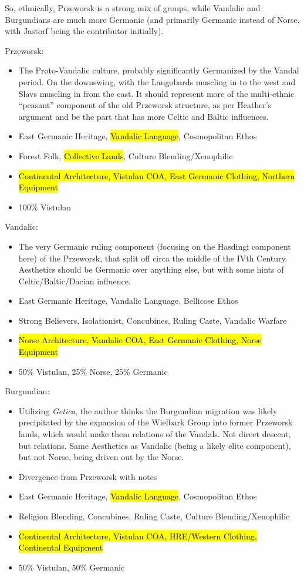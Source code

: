 \documentclass{article}
\begin{document}
	So, ethnically, Przeworsk is a strong mix of groups, while Vandalic and Burgundians are much more Germanic (and primarily Germanic instead of Norse, with Jastorf being the contributor initially).
	
	Przeworsk:
	\begin{itemize}
		\item The Proto-Vandalic culture, probably significantly Germanized by the Vandal period. On the downswing, with the Langobards muscling in to the west and Slavs muscling in from the east.
		It should represent more of the multi-ethnic “peasant” component of the old Przeworsk structure, as per Heather’s argument and be the part that has more Celtic and Baltic influences.
		\item East Germanic Heritage, \hl{Vandalic Language}, Cosmopolitan Ethos
		\item Forest Folk, \hl{Collective Lands}, Culture Blending/Xenophilic
		\item \hl{Continental Architecture, Vistulan COA, East Germanic Clothing, Northern Equipment}
		\item 100\% Vistulan
	\end{itemize}
	
	Vandalic:
	\begin{itemize}
		\item The very Germanic ruling component (focusing on the Hasdingi component here) of the Przeworsk, that split off circa the middle of the IVth Century.
		Aesthetics should be Germanic over anything else, but with some hints of Celtic/Baltic/Dacian influence.
		\item East Germanic Heritage, Vandalic Language, Bellicose Ethos
		\item Strong Believers, Isolationist, Concubines, Ruling Caste, Vandalic Warfare
		\item \hl{Norse Architecture, Vandalic COA, East Germanic Clothing, Norse Equipment}
		\item 50\% Vistulan, 25\% Norse, 25\% Germanic
	\end{itemize}
	
	Burgundian:
	\begin{itemize}
		\item Utilizing \textit{Getica}, the author thinks the Burgundian migration was likely precipitated by the expansion of the Wielbark Group into former Przeworsk lands, which would make them relations of the Vandals.
		Not direct descent, but relations.
		Same Aesthetics as Vandalic (being a likely elite component), but not Norse, being driven out by the Norse.
		\item Divergence from Przeworsk with notes
		\item East Germanic Heritage, \hl{Vandalic Language}, Cosmopolitan Ethos
		\item Religion Blending, Concubines, Ruling Caste, Culture Blending/Xenophilic
		\item \hl{Continental Architecture, Vistulan COA, HRE/Western Clothing, Continental Equipment}
		\item 50\% Vistulan, 50\% Germanic
	\end{itemize}
	
\end{document}
